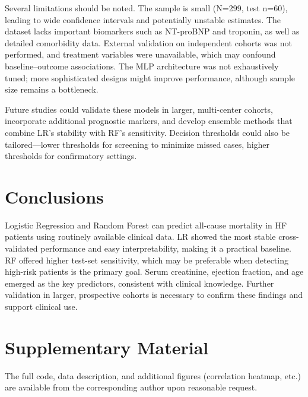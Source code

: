 \documentclass[12pt,a4paper]{article}
\begin{document}
Several limitations should be noted. The sample is small (N=299, test n=60), leading to wide confidence intervals and potentially unstable estimates. The dataset lacks important biomarkers such as NT-proBNP and troponin, as well as detailed comorbidity data. External validation on independent cohorts was not performed, and treatment variables were unavailable, which may confound baseline–outcome associations. The MLP architecture was not exhaustively tuned; more sophisticated designs might improve performance, although sample size remains a bottleneck.

Future studies could validate these models in larger, multi-center cohorts, incorporate additional prognostic markers, and develop ensemble methods that combine LR’s stability with RF’s sensitivity. Decision thresholds could also be tailored—lower thresholds for screening to minimize missed cases, higher thresholds for confirmatory settings.

\section{Conclusions}
Logistic Regression and Random Forest can predict all-cause mortality in HF patients using routinely available clinical data. LR showed the most stable cross-validated performance and easy interpretability, making it a practical baseline. RF offered higher test-set sensitivity, which may be preferable when detecting high-risk patients is the primary goal. Serum creatinine, ejection fraction, and age emerged as the key predictors, consistent with clinical knowledge. Further validation in larger, prospective cohorts is necessary to confirm these findings and support clinical use.

\section*{Supplementary Material}
The full code, data description, and additional figures (correlation heatmap, etc.) are available from the corresponding author upon reasonable request.
\end{document}
